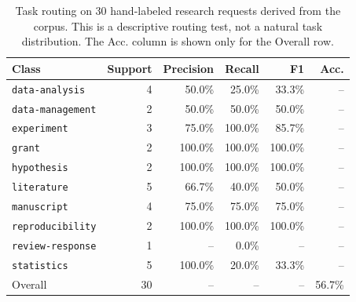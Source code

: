 \begin{table}[t]
\centering
\footnotesize
\caption{Task routing on 30 hand-labeled research requests derived from the corpus. This is a descriptive routing test, not a natural task distribution. The Acc. column is shown only for the Overall row.}
\label{tab:routing}
\begin{tabular}{@{}lrrrrr@{}}
\toprule
Class & Support & Precision & Recall & F1 & Acc. \\
\midrule
\texttt{data-analysis} & 4 & 50.0\% & 25.0\% & 33.3\% & -- \\
\texttt{data-management} & 2 & 50.0\% & 50.0\% & 50.0\% & -- \\
\texttt{experiment} & 3 & 75.0\% & 100.0\% & 85.7\% & -- \\
\texttt{grant} & 2 & 100.0\% & 100.0\% & 100.0\% & -- \\
\texttt{hypothesis} & 2 & 100.0\% & 100.0\% & 100.0\% & -- \\
\texttt{literature} & 5 & 66.7\% & 40.0\% & 50.0\% & -- \\
\texttt{manuscript} & 4 & 75.0\% & 75.0\% & 75.0\% & -- \\
\texttt{reproducibility} & 2 & 100.0\% & 100.0\% & 100.0\% & -- \\
\texttt{review-response} & 1 & -- & 0.0\% & -- & -- \\
\texttt{statistics} & 5 & 100.0\% & 20.0\% & 33.3\% & -- \\
\midrule
Overall & 30 & -- & -- & -- & 56.7\% \\
\bottomrule
\end{tabular}
\end{table}
